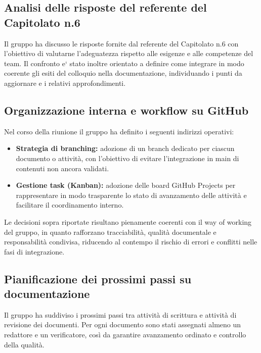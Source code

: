 \documentclass[a4paper,12pt]{article}
\begin{document}
\subsection{Analisi delle risposte del referente del Capitolato n.6}
Il gruppo ha discusso le risposte fornite dal referente del Capitolato n.6 con l'obiettivo di valutarne l'adeguatezza rispetto alle esigenze e alle competenze del team. Il confronto e` stato inoltre orientato a definire come integrare in modo coerente gli esiti del colloquio nella documentazione, individuando i punti da aggiornare e i relativi approfondimenti.

\subsection{Organizzazione interna e workflow su GitHub}
Nel corso della riunione il gruppo ha definito i seguenti indirizzi operativi:
\begin{itemize}
    \item \textbf{Strategia di branching:} adozione di un branch dedicato per ciascun documento o attività, con l'obiettivo di evitare l'integrazione in main di contenuti non ancora validati.
    \item \textbf{Gestione task (Kanban):} adozione delle board GitHub Projects per rappresentare in modo trasparente lo stato di avanzamento delle attività e facilitare il coordinamento interno.
\end{itemize}
Le decisioni sopra riportate risultano pienamente coerenti con il way of working del gruppo, in quanto rafforzano tracciabilità, qualità documentale e responsabilità condivisa, riducendo al contempo il rischio di errori e conflitti nelle fasi di integrazione.

\subsection{Pianificazione dei prossimi passi su documentazione}
Il gruppo ha suddiviso i prossimi passi tra attività di scrittura e attività di revisione dei documenti. Per ogni documento sono stati assegnati almeno un redattore e un verificatore, così da garantire avanzamento ordinato e controllo della qualità.
\end{document}
